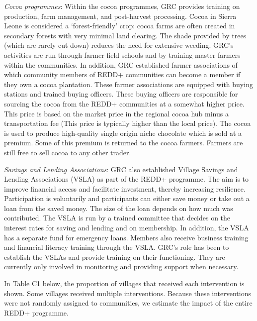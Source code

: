 \documentclass[
]{article}
\begin{document}
\emph{Cocoa programmes}: Within the cocoa programmes, GRC provides
training on production, farm management, and post-harvest processing.
Cocoa in Sierra Leone is considered a `forest-friendly' crop: cocoa
farms are often created in secondary forests with very minimal land
clearing. The shade provided by trees (which are rarely cut down)
reduces the need for extensive weeding. GRC's activities are run through
farmer field schools and by training master farmers within the
communities. In addition, GRC established farmer associations of which
community members of REDD+ communities can become a member if they own a
cocoa plantation. These farmer associations are equipped with buying
stations and trained buying officers. These buying officers are
responsible for sourcing the cocoa from the REDD+ communities at a
somewhat higher price. This price is based on the market price in the
regional cocoa hub minus a transportation fee (This price is typically
higher than the local price). The cocoa is used to produce high-quality
single origin niche chocolate which is sold at a premium. Some of this
premium is returned to the cocoa farmers. Farmers are still free to sell
cocoa to any other trader.

\emph{Savings and Lending Associations}: GRC also established Village
Savings and Lending Associations (VSLA) as part of the REDD+ programme.
The aim is to improve financial access and facilitate investment,
thereby increasing resilience. Participation is voluntarily and
participants can either save money or take out a loan from the saved
money. The size of the loan depends on how much was contributed. The
VSLA is run by a trained committee that decides on the interest rates
for saving and lending and on membership. In addition, the VSLA has a
separate fund for emergency loans. Members also receive business
training and financial literacy training through the VSLA. GRC's role
has been to establish the VSLAs and provide training on their
functioning. They are currently only involved in monitoring and
providing support when necessary.

In Table C1 below, the proportion of villages that received each
intervention is shown. Some villages received multiple interventions.
Because these interventions were not randomly assigned to communities,
we estimate the impact of the entire REDD+ programme.
\end{document}
